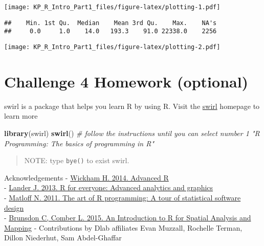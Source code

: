 \documentclass[]{article}
\newenvironment{Shaded}{\begin{snugshade}}{\end{snugshade}}
\newcommand{\KeywordTok}[1]{\textcolor[rgb]{0.13,0.29,0.53}{\textbf{#1}}}
\newcommand{\CommentTok}[1]{\textcolor[rgb]{0.56,0.35,0.01}{\textit{#1}}}
\newcommand{\OperatorTok}[1]{\textcolor[rgb]{0.81,0.36,0.00}{\textbf{#1}}}
\newcommand{\NormalTok}[1]{#1}
\begin{document}
\texttt{[image: KP\_R\_Intro\_Part1\_files/figure-latex/plotting-1.pdf]}

\begin{Shaded}
\end{Shaded}

\begin{verbatim}
##    Min. 1st Qu.  Median    Mean 3rd Qu.    Max.    NA's 
##     0.0     1.0    14.0   193.3    91.0 22338.0    2256
\end{verbatim}

\begin{Shaded}
\end{Shaded}

\texttt{[image: KP\_R\_Intro\_Part1\_files/figure-latex/plotting-2.pdf]}

\section{\texorpdfstring{\textbf{Challenge 4} Homework
(optional)}{Challenge 4 Homework (optional)}}\label{challenge-4-homework-optional}

swirl is a package that helps you learn R by using R. Visit the
\href{http://swirlstats.com/}{swirl} homepage to learn more

\begin{Shaded}
\begin{Highlighting}[]
\KeywordTok{library}\NormalTok{(swirl)}
\KeywordTok{swirl}\NormalTok{()}
\CommentTok{# follow the instructions until you can select number 1 "R Programming: The basics of programming in R"}
\end{Highlighting}
\end{Shaded}

\begin{quote}
NOTE: type \texttt{bye()} to exist swirl.
\end{quote}

Acknowledgements - \href{http://adv-r.had.co.nz/}{Wickham H. 2014.
Advanced R}\\
- \href{http://www.jaredlander.com/r-for-everyone/}{Lander J. 2013. R
for everyone: Advanced analytics and graphics}\\
- \href{https://www.nostarch.com/artofr.htm}{Matloff N. 2011. The art of
R programming: A tour of statistical software design}\\
-
\href{https://us.sagepub.com/en-us/nam/an-introduction-to-r-for-spatial-analysis-and-mapping/book241031}{Brunsdon
C, Comber L. 2015. An Introduction to R for Spatial Analysis and
Mapping} - Contributions by Dlab affiliates Evan Muzzall, Rochelle
Terman, Dillon Niederhut, Sam Abdel-Ghaffar
\end{document}
